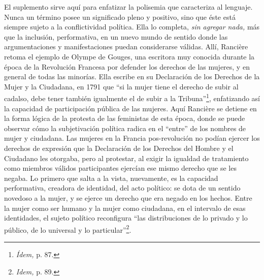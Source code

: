 El suplemento sirve aquí para enfatizar la polisemia que caracteriza al lenguaje. Nunca un término posee un significado pleno y positivo, sino que éste está siempre sujeto a la conflictividad política. Ella lo completa, \emph{sin agregar nada,} más que la inclusión, performativa, en un nuevo mundo de sentido donde las argumentaciones y manifestaciones puedan considerarse válidas. Allí, Rancière retoma el ejemplo de Olympe de Gouges, una escritora muy conocida durante la época de la Revolución Francesa por defender los derechos de las mujeres, y en general de todas las minorías. Ella escribe en su Declaración de los Derechos de la Mujer y la Ciudadana, en 1791 que \enquote{si la mujer tiene el derecho de subir al cadalso, debe tener también igualmente el de subir a la Tribuna}\footnote{\emph{Ídem,} p. 87.}, enfatizando así la capacidad de participación pública de las mujeres. Aquí Rancière se detiene en la forma lógica de la protesta de las feministas de esta época, donde se puede observar cómo la subjetivación política radica en el \enquote{entre} de los nombres de mujer y ciudadana. Las mujeres en la Francia pos-revolución no podían ejercer los derechos de expresión que la Declaración de los Derechos del Hombre y el Ciudadano les otorgaba, pero al protestar, al exigir la igualdad de tratamiento como miembros válidos participantes ejercían ese mismo derecho que se les negaba. Lo primero que salta a la vista, nuevamente, es la capacidad performativa, creadora de identidad, del acto político: se dota de un sentido novedoso a la mujer, y se ejerce un derecho que era negado en los hechos. Entre la mujer como ser humano y la mujer como ciudadana, en el intervalo de esas identidades, el sujeto político reconfigura \enquote{las distribuciones de lo privado y lo público, de lo universal y lo particular}\footnote{\emph{Idem,} p. 89.}.

